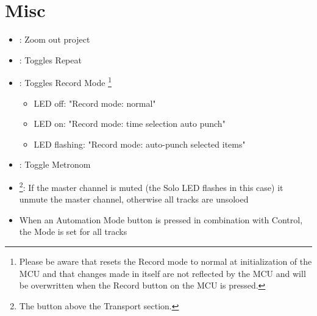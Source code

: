 \section{Misc}\label{misc}
\enlargethispage{2\baselineskip}
\begin{itemize}
\item \shift \zoom: Zoom out project

\item \cycle: Toggles Repeat

\item \drop: Toggles Record Mode \footnote{Please be aware that \mcu
    resets the Record mode to normal at initialization of the MCU
    and that changes made in \reaper itself are not reflected by the
    MCU and will be overwritten when the Record button on the MCU is
    pressed.} \bemod
\begin{itemize}
	\item LED off:   "Record mode: normal"
	\item LED on:    "Record mode: time selection auto punch"
	\item LED flashing: "Record mode: auto-punch selected items"
\end{itemize}
\item \click: Toggle Metronom
\item \solo\footnote{The \solo button above the Transport section.}:
  If the master channel is muted (the Solo LED flashes in this case)
  it unmute the master channel, otherwise all tracks are unsoloed
\item When an Automation Mode button is pressed in combination with
  Control, the Mode is set for all tracks
\end{itemize}


